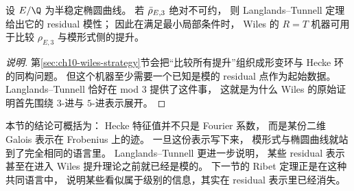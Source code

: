 \begin{proposition}
\label{prop:ch09-lt-starts-wiles}
设 $E/\Q$ 为半稳定椭圆曲线。
若 $\bar{\rho}_{E,3}$ 绝对不可约，
则 Langlands--Tunnell 定理给出它的 residual 模性；
因此在满足最小局部条件时，
Wiles 的 $R=T$ 机器可用于比较 $\rho_{E,3}$ 与模形式侧的提升。
\end{proposition}

\begin{proof}[说明]
第\ref{sec:ch10-wiles-strategy}节会把“比较所有提升”组织成形变环与 Hecke 环的同构问题。
但这个机器至少需要一个已知是模的 residual 点作为起始数据。
Langlands--Tunnell 恰好在 mod $3$ 提供了这件事，
这就是为什么 Wiles 的原始证明首先围绕 $3$-进与 $5$-进表示展开。
\end{proof}

本节的结论可概括为：
Hecke 特征值并不只是 Fourier 系数，
而是某份二维 Galois 表示在 Frobenius 上的迹。
一旦这份表示写下来，
模形式与椭圆曲线就站到了完全相同的语言里。
Langlands--Tunnell 更进一步说明，
某些 residual 表示甚至在进入 Wiles 提升理论之前就已经是模的。
下一节的 Ribet 定理正是在这种共同语言中，
说明某些看似属于级别的信息，其实在 residual 表示里已经消失。 
